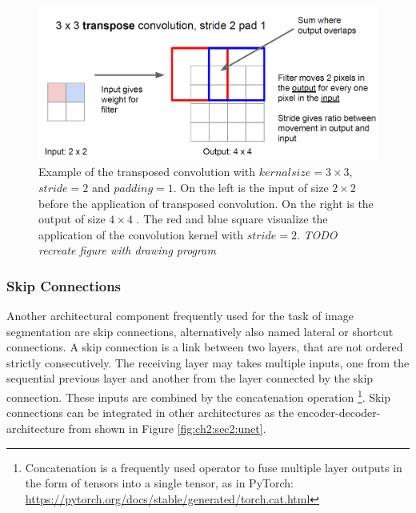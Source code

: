 \begin{figure}
	\includegraphics[width=\linewidth]{figures/chap223_transpose_conv.png}
	\caption[Transposed Convolution]{
		Example of the transposed convolution \cite{Li17-StanfordLecture} with $kernal size = 3 \times 3$, $stride = 2$ and $padding = 1$. 
		On the left is the input of size $2 \times 2$  before the application of transposed convolution.
		On the right is the output of size $4 \times 4$ . 
		The red and blue square visualize the application of the convolution kernel with $stride = 2$. 
		\textit{TODO recreate figure with drawing program}}
	\label{fig:ch2:sec2:transposed-conv}
\end{figure}


\subsubsection{Skip Connections} \label{ord:ch2:sec2:subsec3:skipconnections}
Another architectural component frequently used for the task of image segmentation are skip connections, alternatively also named lateral or shortcut connections.
A skip connection is a link between two layers, that are not ordered strictly consecutively. 
The receiving layer may takes multiple inputs, one from the sequential previous layer and another from the layer connected by the skip connection.
These inputs are combined by the concatenation operation
\footnote{Concatenation is a frequently used operator to fuse multiple layer outputs in the form of tensors into a single tensor, as in PyTorch: \url{https://pytorch.org/docs/stable/generated/torch.cat.html}}.
Skip connections can be integrated in other architectures as \eg the encoder-decoder-architecture from \cite{RF15-U-Net} shown in Figure \ref{fig:ch2:sec2:unet}.

